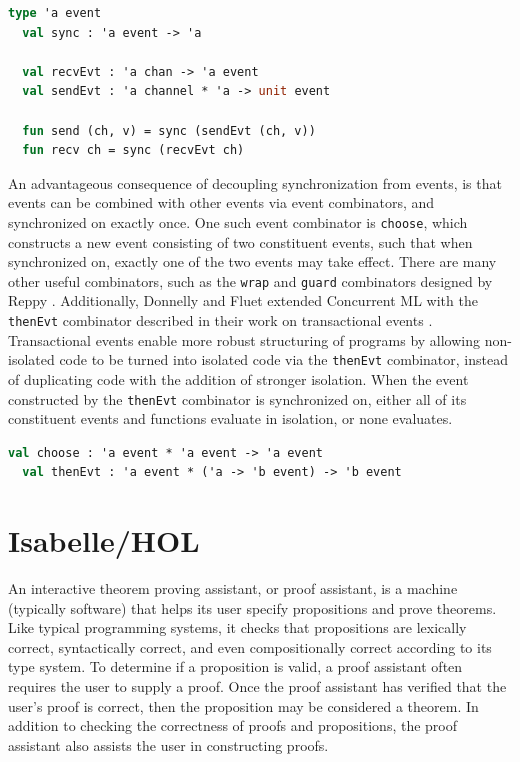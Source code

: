 \documentclass[letterpaper, 11pt]{report}
\begin{document}
\begin{lstlisting}[language=ML, mathescape]
  type 'a event
  val sync : 'a event -> 'a

  val recvEvt : 'a chan -> 'a event
  val sendEvt : 'a channel * 'a -> unit event

  fun send (ch, v) = sync (sendEvt (ch, v))
  fun recv ch = sync (recvEvt ch)
\end{lstlisting}

An advantageous consequence of decoupling synchronization from events, is that events can be
combined with other events via event combinators, and synchronized on exactly once. One such
event combinator is \lstinline{choose}, which constructs a new event consisting of two
constituent events, such that when synchronized on, exactly one of the two events may take
effect. There are many other useful combinators, such as the \lstinline{wrap} and
\lstinline{guard} combinators designed by Reppy \cite{reppy2007specialization}.
Additionally, Donnelly and Fluet extended
Concurrent ML with the \lstinline{thenEvt} combinator described in their work on
transactional events \cite{donnelly2008transactional}. Transactional events enable more robust
structuring of programs by allowing non-isolated code to be turned into isolated code via
the \lstinline{thenEvt} combinator, instead of duplicating code with the addition of stronger
isolation. When the event constructed by the \lstinline{thenEvt} combinator is synchronized
on, either all of its constituent events and functions evaluate in isolation, or none
evaluates.

\begin{lstlisting}[language=ML, mathescape]
  val choose : 'a event * 'a event -> 'a event
  val thenEvt : 'a event * ('a -> 'b event) -> 'b event
  \end{lstlisting}


\section{Isabelle/HOL}
An interactive theorem proving assistant, or proof assistant, is a machine (typically software) that helps its user
specify propositions and prove theorems. Like typical programming systems, it checks
that propositions are lexically correct, syntactically correct, and
even compositionally correct according to its type system. To determine if a proposition is valid, a proof assistant
often requires the user to supply a proof. Once the proof assistant has verified that the user's proof is correct,
then the proposition may be considered a theorem. In addition to checking the correctness of proofs and
propositions, the proof assistant also assists the user in constructing proofs.
\end{document}
